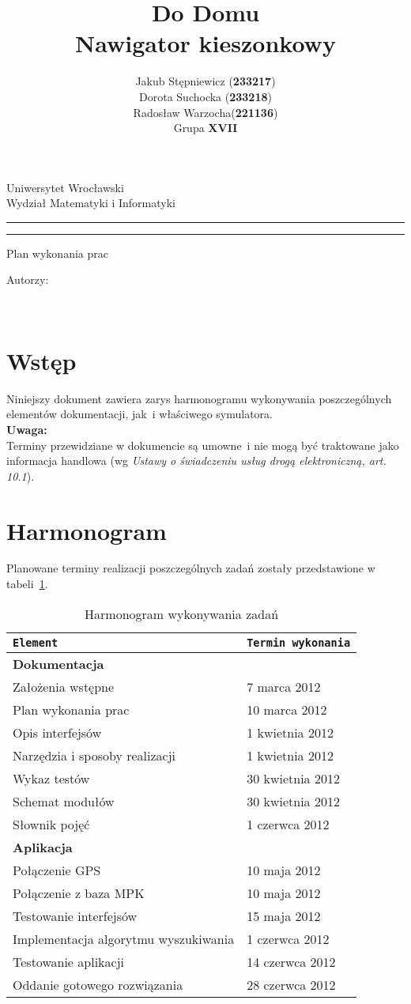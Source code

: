 \documentclass[12pt,a4paper]{article}
\author{Jakub Stępniewicz (\textbf{233217})\\Dorota Suchocka (\textbf{233218})\\Radosław Warzocha(\textbf{221136}) \\Grupa {\bf XVII}}
\title{Do Domu\\ \small{Nawigator kieszonkowy}}
\makeatletter
\newcommand{\linia}{\rule{\linewidth}{0.4mm}}
\renewcommand{\maketitle}{\begin{titlepage}
		\vspace*{1cm}
    \begin{center}\small
    	Uniwersytet Wrocławski\\
    	Wydział Matematyki i Informatyki\\
    \end{center}
    \vspace{3cm}
    \noindent
    \linia
    \begin{center}
    	\LARGE{\textsc{\@title}}
         \end{center}
     \linia
    \begin{center}
    	\Large{Plan wykonania prac}
         \end{center}
    \vspace{0.5cm}

    \begin{flushright}

    \begin{minipage}{5.5cm}

    	\small Autorzy:

    \normalsize {\@author} \par
    

    \end{minipage}
    \vspace{5cm}

     

     \end{flushright}

    \vspace*{\stretch{6}}

    \begin{center}

    \@date\\

    \end{center}

  \end{titlepage}%

}
\makeatother
\begin{document}
\maketitle
\tableofcontents
\vspace{5cm}

\newpage
% 

\section{Wstęp}
Niniejszy dokument zawiera zarys harmonogramu wykonywania poszczególnych elementów dokumentacji, jak~i właściwego symulatora. \\ {\bf
	Uwaga:}\\
	Terminy przewidziane w dokumencie są umowne~i nie mogą być traktowane jako informacja handlowa 
	(wg {\it Ustawy o świadczeniu usług drogą elektroniczną, art. 10.1}).

\section{Harmonogram}
Planowane terminy realizacji poszczególnych zadań zostały przedstawione w tabeli~\ref{har}.

\begin{table}[h]
\caption{Harmonogram wykonywania zadań}
	\begin{center}
\begin{tabular}{l|l}
\texttt{Element} & \texttt{Termin wykonania} \\ \hline
{\bf Dokumentacja}\\
		Założenia wstępne & 7 marca 2012 \\
		Plan wykonania prac & 10 marca 2012 \\
		Opis interfejsów & 1 kwietnia 2012 \\
		Narzędzia i sposoby realizacji & 1 kwietnia 2012 \\
		Wykaz testów	& 30 kwietnia 2012 \\
		Schemat modułów	&	30 kwietnia 2012 \\
		Słownik pojęć & 1 czerwca 2012 \\ \hline
{\bf Aplikacja}\\ 
		Połączenie GPS & 10 maja 2012 \\
		Połączenie z baza MPK & 10 maja 2012 \\
		Testowanie interfejsów & 15 maja 2012 \\
		Implementacja algorytmu wyszukiwania & 1 czerwca 2012 \\
		Testowanie aplikacji & 14 czerwca 2012 \\
		Oddanie gotowego rozwiązania & 28 czerwca 2012 \\
\end{tabular}
\label{har}
\end{center}
\end{table}
\end{document}
